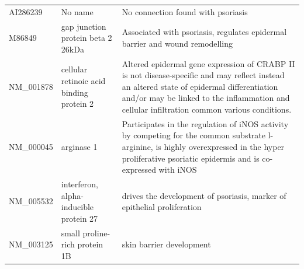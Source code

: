 \documentclass[10pt,a4paper]{report}
\begin{document}
\begin{table}[]
\begin{tabular}{l|p{4.5cm} p{8.5cm}}
			AI286239           &  No name                                                                                                                       &   No connection found with psoriasis                                                                                                                                                                                                                                        \\
			M86849             & gap junction protein beta 2 26kDa                                                                                       & Associated with psoriasis, regulates epidermal barrier and wound remodelling \cite{sun2010association, djalilian2006connexin}                                                                                                                                                               \\
			NM\_001878         & cellular retinoic acid binding protein 2                                                                                & Altered epidermal gene expression of CRABP II is not disease-specific and may reflect instead an altered state of epidermal differentiation and/or may be linked to the inflammation and cellular infiltration common various conditions. \cite{algermissen1996differential} \\
			NM\_000045         & arginase 1                                                                                                              & Participates in the regulation of iNOS activity by competing for the common substrate l-arginine, is highly overexpressed in the hyper proliferative psoriatic epidermis and is co-expressed with iNOS \cite{bruch2003arginase}                                     \\
			NM\_005532         & interferon, alpha-inducible protein 27                                                                                  & drives the development of psoriasis, marker of epithelial proliferation \cite{nestle2005plasmacytoid, suomela2004interferon}                                                                                                                                                                     \\
			NM\_003125         & small proline-rich protein 1B                                                                                           & skin barrier development \cite{bergboer2012genetics}                                                                                                                                                                                                                    \\

\end{tabular}
\end{table}
\end{document}
